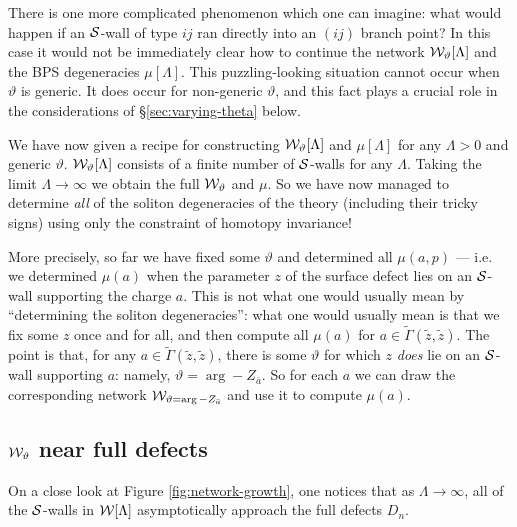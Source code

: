 \documentclass[11pt,a4paper]{article}
\def\wnet {{\cal W}}
\def\CS {{\cal S}}
\def\cS {{\cal S}}
\def\tz{{\tilde z}}
\newcommand{\tGamma}{\tilde\Gamma}
\newcommand{\ti}[1]{\textit{#1}}
\def\wnet {{\cal W}}
\def\CS {{\cal S}}
\begin{document}
There is one more complicated phenomenon which one can imagine:
what would happen if an $\cS$-wall of type $ij$ ran directly into an $(ij)$ branch point?
In this case it would not be immediately clear how to continue the network
$\wnet_\vartheta[\Lambda]$ and the BPS degeneracies $\mu[\Lambda]$.
This puzzling-looking situation cannot occur when $\vartheta$ is generic.
It does occur for non-generic $\vartheta$,
and this fact plays a crucial role in the considerations of \S\ref{sec:varying-theta} below.

We have now
given a recipe for constructing $\wnet_\vartheta[\Lambda]$ and $\mu[\Lambda]$
for any $\Lambda > 0$ and generic $\vartheta$.  $\wnet_\vartheta[\Lambda]$
consists of a finite number of $\cS$-walls for any $\Lambda$.
Taking the limit $\Lambda \to \infty$ we obtain the full $\wnet_\vartheta$
and $\mu$.  So we have now managed to determine \ti{all} of the soliton degeneracies of the
theory (including their tricky signs) using only the constraint of homotopy invariance!

More precisely, so far we have fixed some $\vartheta$ and determined all $\mu(a,p)$ --- i.e. we determined $\mu(a)$
when the parameter $z$ of the surface defect lies on an $\CS$-wall supporting the charge $a$.  This is not what one
would usually mean by ``determining the soliton degeneracies'':  what one would usually mean is that we fix some $z$
once and for all, and then compute all $\mu(a)$ for $a \in \tGamma(\tz,\tz)$.  The point is that, for any $a \in \tGamma(\tz,\tz)$,
there is some $\vartheta$ for which $z$ \ti{does} lie on an $\CS$-wall supporting $a$:  namely,
$\vartheta = \arg -Z_{\bar a}$.  So for each $a$ we can draw the corresponding network $\wnet_{\vartheta= \arg -Z_{\bar a}}$
and use it to compute $\mu(a)$.


\subsection{$\wnet_\vartheta$ near full defects} \label{sec:falling-down-holes}

On a close look at Figure \ref{fig:network-growth}, one notices that
as $\Lambda \to \infty$, all of the $\cS$-walls in $\wnet[\Lambda]$
asymptotically approach the full defects $D_n$.
\end{document}
